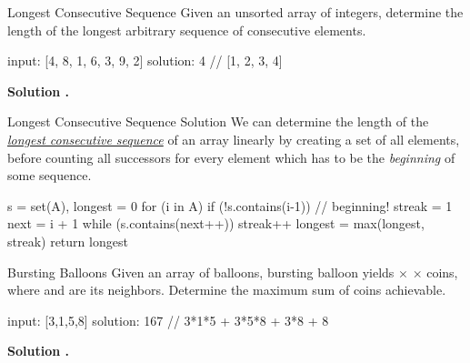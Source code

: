 \documentclass{cognito}
\begin{document}
\begin{note}{Longest Consecutive Sequence}
	Given an unsorted array  of integers, determine the length of the longest arbitrary sequence
	of consecutive elements.
	
	\begin{largecode}
 input: [4, 8, 1, 6, 3, 9, 2]
 solution: 4  // [1, 2, 3, 4]
	\end{largecode}
	\bf Solution \hyperref[note:Longest Consecutive Sequence Solution]{\solutionref}.
\end{note}

\begin{note}{Longest Consecutive Sequence Solution}
	We can determine the length of the \hyperref[note:Longest Consecutive Sequence]{\it longest consecutive sequence}
	of an array  linearly by creating a set of all elements, before counting all successors for every element
	which has to be the {\it beginning} of some sequence.
	
	\begin{largecode}
 s = set(A), longest = 0
 for (i in A)
 	if (!s.contains(i-1)) // beginning!
		streak = 1
		next = i + 1
		while (s.contains(next++)) streak++
		longest = max(longest, streak)
return longest
	\end{largecode}
	\vspace{-5pt}
\end{note}

\begin{note}{Bursting Balloons}
	Given an array  of balloons, bursting balloon 
	yields  $\times$  $\times$  coins, where  and  are
	its neighbors. Determine the maximum sum of coins achievable.

	\begin{largecode}
 input: [3,1,5,8]
 solution: 167  // 3*1*5 + 3*5*8 + 3*8 + 8
	\end{largecode}
	\bf Solution \hyperref[note:Bursting Balloons DP]{\solutionref}.
\end{note}
\end{document}

